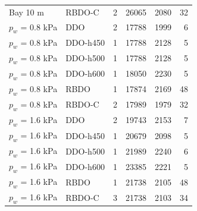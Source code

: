 \begin{tabular}{llrrrr}
Bay 10 m & RBDO-C & 2 & 26065 & 2080 & 32 \\
$p_w$ = 0.8 kPa & DDO & 2 & 17788 & 1999 & 6 \\
$p_w$ = 0.8 kPa & DDO-h450 & 1 & 17788 & 2128 & 5 \\
$p_w$ = 0.8 kPa & DDO-h500 & 1 & 17788 & 2128 & 5 \\
$p_w$ = 0.8 kPa & DDO-h600 & 1 & 18050 & 2230 & 5 \\
$p_w$ = 0.8 kPa & RBDO & 1 & 17874 & 2169 & 48 \\
$p_w$ = 0.8 kPa & RBDO-C & 2 & 17989 & 1979 & 32 \\
$p_w$ = 1.6 kPa & DDO & 2 & 19743 & 2153 & 7 \\
$p_w$ = 1.6 kPa & DDO-h450 & 1 & 20679 & 2098 & 5 \\
$p_w$ = 1.6 kPa & DDO-h500 & 1 & 21989 & 2240 & 6 \\
$p_w$ = 1.6 kPa & DDO-h600 & 1 & 23385 & 2221 & 5 \\
$p_w$ = 1.6 kPa & RBDO & 1 & 21738 & 2105 & 48 \\
$p_w$ = 1.6 kPa & RBDO-C & 3 & 21738 & 2103 & 34 \\
\bottomrule
\end{tabular}